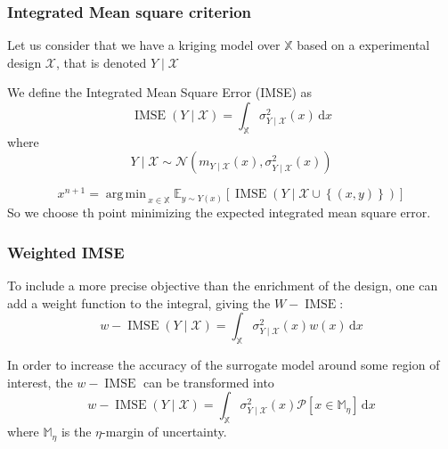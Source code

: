 \documentclass[a4paper,11pt]{article}
\newcommand{\Ex}{\mathbb{E}}
\newcommand{\ProbGP}{\mathcal{P}}
\newcommand{\Xspace}{\mathbb{X}}
\DeclareMathOperator*{\argmin}{arg\,min \,}
\DeclareMathOperator{\IMSE}{IMSE}
\theoremstyle{defi}
\numberwithin{thmCounter}{section}
\begin{document}
\subsubsection{Integrated Mean square criterion}
\cite{sacks_designs_1989}
Let us consider that we have a kriging model over $\Xspace$ based on a experimental design $\mathcal{X}$, that is denoted $Y \mid \mathcal{X}$

We define the Integrated Mean Square Error (IMSE) as
\begin{equation}
  \IMSE(Y \mid \mathcal{X}) = \int_{\Xspace} \sigma_{Y\mid\mathcal{X}}^2(x)\,\mathrm{d}x
\end{equation}
where
\begin{equation}
  Y\mid \mathcal{X} \sim \mathcal{N}(m_{Y\mid\mathcal{X}}(x),\sigma^2_{Y\mid\mathcal{X}}(x))
\end{equation}


\begin{equation}
  x^{n+1} = \argmin_{x\in \Xspace}\Ex_{y\sim Y(x)}\left[\IMSE\left(Y \mid \mathcal{X}\cup \left\{(x, y)\right\}\right) \right]
\end{equation}
So we choose th point minimizing the expected integrated mean square error.

\subsubsection{Weighted IMSE}
To include a more precise objective than the enrichment of the design, one can add a weight function to the integral, giving the $W-\IMSE$:
\begin{equation}
  \label{eq:w-imse}
  w-\IMSE(Y\mid \mathcal{X}) = \int_{\Xspace} \sigma_{Y\mid\mathcal{X}}^2(x)w(x)\,\mathrm{d}x
\end{equation}

In order to increase the accuracy of the surrogate model around some region of interest, the $w-\IMSE$ can be transformed into
\begin{equation}
  w-\IMSE(Y\mid \mathcal{X}) = \int_{\Xspace} \sigma_{Y\mid\mathcal{X}}^2(x)\ProbGP\left[x \in \mathbb{M}_{\eta}\right]\,\mathrm{d}x
\end{equation}
where $\mathbb{M}_{\eta}$ is the $\eta$-margin of uncertainty.
\end{document}
